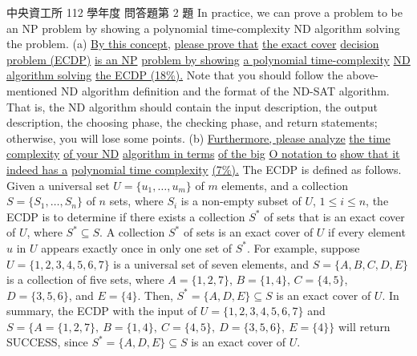 \begin{pastexam}[label={px:ncu-112-dsa-12}]{中央資工所 112 學年度 問答題第 2 題}
In practice, we can prove a problem to be an NP problem by showing a polynomial time-complexity ND
algorithm solving the problem. (a) \underline{By this concept,} \underline{please prove that}
\underline{the exact cover} \underline{decision problem (ECDP)} \underline{is an NP} \underline{problem by
showing} \underline{a polynomial time-complexity} \underline{ND algorithm solving} \underline{the ECDP
(18\%).} Note that you should follow the above-mentioned ND algorithm definition and the format of the
ND-SAT algorithm. That is, the ND algorithm should contain the input description, the output
description, the choosing phase, the checking phase, and return statements; otherwise, you will lose
some points. (b) \underline{Furthermore, please analyze} \underline{the time complexity} \underline{of
your ND} \underline{algorithm in terms} \underline{of the big} \underline{O notation to} \underline{show
that it} \underline{indeed has a} \underline{polynomial time complexity} \underline{(7\%).} The ECDP is
defined as follows. Given a universal set $U=\{u_1,\ldots,u_m\}$ of $m$ elements, and a collection
$S=\{S_1,\ldots,S_n\}$ of $n$ sets, where $S_i$ is a non-empty subset of $U$, $1\le i\le n$, the ECDP is
to determine if there exists a collection $S^*$ of sets that is an exact cover of $U$, where
$S^*\subseteq S$. A collection $S^*$ of sets is an exact cover of $U$ if every element $u$ in $U$ appears
exactly once in only one set of $S^*$. For example, suppose $U=\{1,2,3,4,5,6,7\}$ is a universal set of
seven elements, and $S=\{A,B,C,D,E\}$ is a collection of five sets, where $A=\{1,2,7\}$, $B=\{1,4\}$,
$C=\{4,5\}$, $D=\{3,5,6\}$, and $E=\{4\}$. Then, $S^*=\{A,D,E\}\subseteq S$ is an exact cover of $U$. In
summary, the ECDP with the input of $U=\{1,2,3,4,5,6,7\}$ and $S=\{A=\{1,2,7\},\ B=\{1,4\},\
C=\{4,5\},\ D=\{3,5,6\},\ E=\{4\}\}$ will return SUCCESS, since $S^*=\{A,D,E\}\subseteq S$ is an exact
cover of $U$.
\end{pastexam}


